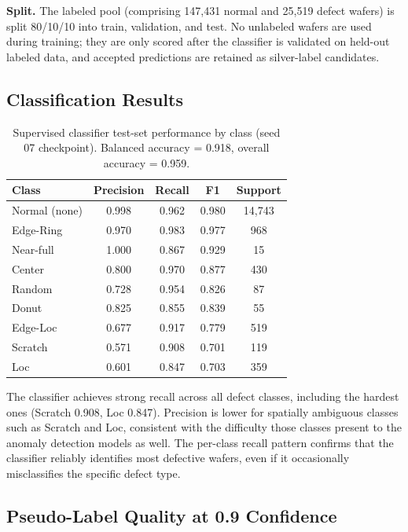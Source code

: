 \documentclass[11pt]{article}
\begin{document}
\textbf{Split.} The labeled pool (comprising 147,431 normal and 25,519 defect wafers) is split 80/10/10 into train, validation, and test. No unlabeled wafers are used during training; they are only scored after the classifier is validated on held-out labeled data, and accepted predictions are retained as silver-label candidates.

\subsection{Classification Results}

\begin{table}[H]
\centering
\caption{Supervised classifier test-set performance by class (seed 07 checkpoint). Balanced accuracy = 0.918, overall accuracy = 0.959.}
\label{tab:classifier_results}
\begin{tabular}{lcccc}
\toprule
Class & Precision & Recall & F1 & Support \\
\midrule
Normal (none) & 0.998 & 0.962 & 0.980 & 14{,}743 \\
Edge-Ring     & 0.970 & 0.983 & 0.977 & 968 \\
Near-full     & 1.000 & 0.867 & 0.929 & 15 \\
Center        & 0.800 & 0.970 & 0.877 & 430 \\
Random        & 0.728 & 0.954 & 0.826 & 87 \\
Donut         & 0.825 & 0.855 & 0.839 & 55 \\
Edge-Loc      & 0.677 & 0.917 & 0.779 & 519 \\
Scratch       & 0.571 & 0.908 & 0.701 & 119 \\
Loc           & 0.601 & 0.847 & 0.703 & 359 \\
\bottomrule
\end{tabular}
\end{table}

The classifier achieves strong recall across all defect classes, including the hardest ones (Scratch 0.908, Loc 0.847). Precision is lower for spatially ambiguous classes such as Scratch and Loc, consistent with the difficulty those classes present to the anomaly detection models as well. The per-class recall pattern confirms that the classifier reliably identifies most defective wafers, even if it occasionally misclassifies the specific defect type.

\subsection{Pseudo-Label Quality at 0.9 Confidence}
\end{document}
